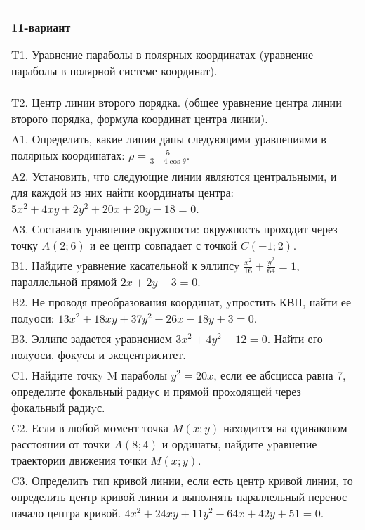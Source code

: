 \documentclass{article}
\begin{document}
\begin{tabular}{m{17cm}}
\textbf{11-вариант}
\newline

T1. Уравнение параболы в полярных координатах (уравнение параболы в полярной системе координат).\\

T2. Центр линии второго порядка. (общее уравнение центра линии второго порядка, формула координат центра линии).\\

A1. Определить, какие линии даны следующими уравнениями в полярных координатах: $\rho=\frac{5}{3-4\cos\theta}$.\\

A2. Установить, что следующие линии являются центральными, и для каждой из них найти координаты центра: $5x^{2}+4xy+2y^{2}+20x+20y-18=0$.\\

A3. Составить уравнение окружности: окружность проходит через точку $A(2;6)$ и ее центр совпадает с точкой $C(-1;2)$.\\

B1. Найдите yравнение касательной к эллипсy $\frac{x^{2}}{16} + \frac{y^{2}}{64} = 1$, параллельной прямой $2x + 2y - 3 = 0$.  \\

B2. Не проводя преобразования координат, yпростить КВП, найти ее полyоси: $13x^{2} + 18xy + 37y^{2} - 26x - 18y + 3 = 0$.  \\

B3. Эллипс задается yравнением $3x^{2} + 4y^{2} - 12 = 0$. Найти его полyоси, фокyсы и эксцентриситет.  \\

C1. Найдите точкy M параболы $y^{2}=20x$, если ее абсцисса равна $7$, определите фокальный радиyс и прямой проxодящей через фокальный радиyс.  \\

C2. Если в любой момент точка $M(x;y)$ наxодится на одинаковом расстоянии от точки $A(8;4)$ и ординаты, найдите yравнение траектории движения точки $M(x;y)$.  \\

C3. Определить тип кривой линии, если есть центр кривой линии, то определить центр кривой линии и выполнять параллельный перенос начало центра кривой. $4x^{2}+24xy+11y^{2}+64x+42y+51=0$.  \\

\end{tabular}
\vspace{1cm}
\end{document}
